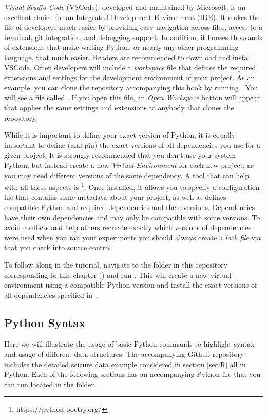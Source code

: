\textit{Visual Studio Code} (VSCode), developed and maintained by Microsoft, is an excellent choice for an Integrated Development Environment (IDE).
It makes the life of developers much easier by providing easy navigation across files, access to a terminal, git integration, and debugging support.
In addition, it houses thousands of extensions that make writing Python, or nearly any other programming language, that much easier.
Readers are recommended to download and install VSCode.
Often developers will include a \textit{workspace} file that defines the required extensions and settings for the development environment of your project.
As an example, you can clone the repository accompanying this book by running .
You will see a file called .
If you open this file, an \textit{Open Workspace} button will appear that applies the same settings and extensions to anybody that clones the repository.

While it is important to define your exact version of Python, it is equally important to define (and pin) the exact versions of all dependencies you use for a given project.
It is strongly recommended that you don't use your system Python, but instead create a new \textit{Virtual Environment} for each new project, as you may need different versions of the same dependency.
A tool that can help with all these aspects is \footnote{https://python-poetry.org/}.
Once installed, it allows you to specify a  configuration file that contains some metadata about your project, as well as defines compatible Python and required dependencies and their versions.
Dependencies have their own dependencies and may only be compatible with some versions.
To avoid conflicts and help others recreate exactly which versions of dependencies were used when you ran your experiments you should always create a \textit{lock file} via  that you check into source control.

To follow along in the tutorial, navigate to the folder in this repository corresponding to this chapter () and run .
This will create a new virtual environment using a compatible Python version and install the exact versions of all dependencies specified in .
\subsection{Python Syntax}
Here we will illustrate the usage of basic Python commands to highlight syntax and usage of different data structures. The accompanying Github repository includes the detailed seizure data example considered in section \ref{sec:R} all in Python.
Each of the following sections has an accompanying Python file that you can run located in the  folder.

